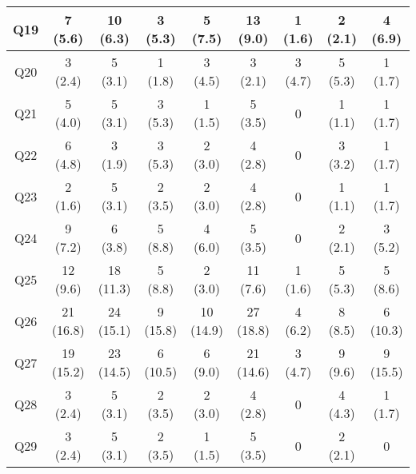\begin{table}[htb]
\begin{center}
\begin{tabular}{|c|c|c|c|c|c|c|c|c|}
\hline%
Q19 & 7 (5.6) & 10 (6.3) & 3 (5.3) & 5 (7.5) & 13 (9.0) & 1 (1.6) & 2 (2.1) & 4 (6.9) \\%
\hline%
Q20 & 3 (2.4) & 5 (3.1) & 1 (1.8) & 3 (4.5) & 3 (2.1) & 3 (4.7) & 5 (5.3) & 1 (1.7) \\%
\hline%
Q21 & 5 (4.0) & 5 (3.1) & 3 (5.3) & 1 (1.5) & 5 (3.5) & 0 & 1 (1.1) & 1 (1.7) \\%
\hline%
Q22 & 6 (4.8) & 3 (1.9) & 3 (5.3) & 2 (3.0) & 4 (2.8) & 0 & 3 (3.2) & 1 (1.7) \\%
\hline%
Q23 & 2 (1.6) & 5 (3.1) & 2 (3.5) & 2 (3.0) & 4 (2.8) & 0 & 1 (1.1) & 1 (1.7) \\%
\hline%
Q24 & 9 (7.2) & 6 (3.8) & 5 (8.8) & 4 (6.0) & 5 (3.5) & 0 & 2 (2.1) & 3 (5.2) \\%
\hline%
Q25 & 12 (9.6) & 18 (11.3) & 5 (8.8) & 2 (3.0) & 11 (7.6) & 1 (1.6) & 5 (5.3) & 5 (8.6) \\%
\hline%
Q26 & 21 (16.8) & 24 (15.1) & 9 (15.8) & 10 (14.9) & 27 (18.8) & 4 (6.2) & 8 (8.5) & 6 (10.3) \\%
\hline%
Q27 & 19 (15.2) & 23 (14.5) & 6 (10.5) & 6 (9.0) & 21 (14.6) & 3 (4.7) & 9 (9.6) & 9 (15.5) \\%
\hline%
Q28 & 3 (2.4) & 5 (3.1) & 2 (3.5) & 2 (3.0) & 4 (2.8) & 0 & 4 (4.3) & 1 (1.7) \\%
\hline%
Q29 & 3 (2.4) & 5 (3.1) & 2 (3.5) & 1 (1.5) & 5 (3.5) & 0 & 2 (2.1) & 0 \\%
\hline%
\end{tabular}%
\end{center}%
\end{table}%

